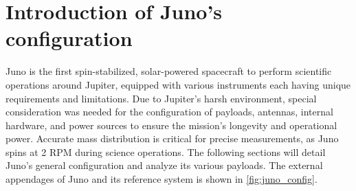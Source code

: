 \section{Introduction of Juno's configuration}
\label{sec:config_introduction}

Juno is the first spin-stabilized, solar-powered spacecraft to perform scientific operations around Jupiter, equipped with various instruments each having unique requirements and limitations. Due to Jupiter's harsh environment, special consideration was needed for the configuration of payloads, antennas, internal hardware, and power sources to ensure the mission's longevity and operational power. Accurate mass distribution is critical for precise measurements, as Juno spins at 2 RPM during science operations.\cite{Juno_launch} The following sections will detail Juno's general configuration and analyze its various payloads.
The external appendages of Juno and its reference system is shown in \autoref{fig:juno_config}.